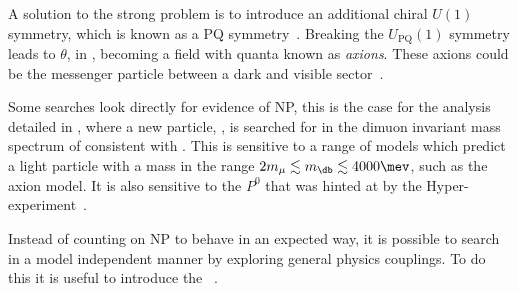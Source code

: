A solution to the strong \CP problem is to introduce an additional chiral $U(1)$ symmetry,
which is known as a \gls{PQ} symmetry~\cite{Peccei:2006as}.
Breaking the $U_\mathrm{PQ}(1)$ symmetry leads to $\theta$, in , becoming a
field with quanta known as \emph{axions}.
These axions could be the messenger particle between a dark and visible
sector~\cite{Peccei:2006as}.







Some searches look directly for evidence of NP, this is the case for the analysis detailed in
, where a new particle, \db, is searched for in the dimuon invariant mass spectrum of
\decay{\Bd}{\Kstarent\mumu} consistent with \decay{\db}{\mumu}.
This is sensitive to a range of models which predict a light particle with a mass in the range
$2m_\mu\lesssim m_\db\lesssim4000\mev$, such as the axion model.
It is also sensitive to the $P^0$ that was hinted at by the Hyper-\CP
experiment~\cite{Park:2005eka}.

Instead of counting on NP to behave in an expected way, it is possible to search in a model
independent manner by exploring general physics couplings.
To do this it is useful to introduce the \OPE~\cite{PhysRev.179.1499}.


